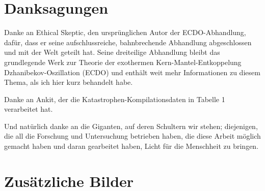 \documentclass[10pt,twocolumn,letterpaper]{article}
\begin{document}
\section{Danksagungen}

Danke an Ethical Skeptic, den ursprünglichen Autor der ECDO-Abhandlung, dafür, dass er seine aufschlussreiche, bahnbrechende Abhandlung abgeschlossen und mit der Welt geteilt hat. Seine dreiteilige Abhandlung \cite{1} bleibt das grundlegende Werk zur Theorie der exothermen Kern-Mantel-Entkoppelung Dzhanibekov-Oszillation (ECDO) und enthält weit mehr Informationen zu diesem Thema, als ich hier kurz behandelt habe.

Danke an Ankit, der die Katastrophen-Kompilationsdaten in Tabelle 1 verarbeitet hat.

Und natürlich danke an die Giganten, auf deren Schultern wir stehen; diejenigen, die all die Forschung und Untersuchung betrieben haben, die diese Arbeit möglich gemacht haben und daran gearbeitet haben, Licht für die Menschheit zu bringen.

\clearpage
\twocolumn

\section{Zusätzliche Bilder}
\end{document}
